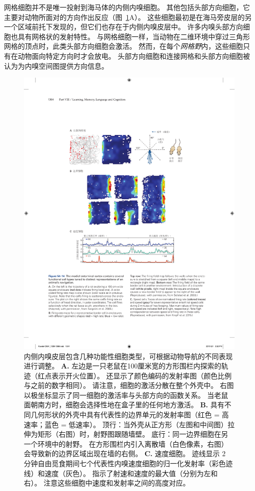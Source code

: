 网格细胞并不是唯一投射到海马体的内侧内嗅细胞。
其他包括头部方向细胞，它主要对动物所面对的方向作出反应（图~\ref{fig:54_14}A）。
这些细胞最初是在海马旁皮层的另一个区域前托下发现的，但它们也存在于内侧内嗅皮层中。
许多内嗅头部方向细胞也具有网格状的发射特性。
与网格细胞一样，当动物在二维环境中穿过三角形网格的顶点时，此类头部方向细胞会激活。
然而，在每个\textit{网格野}内，这些细胞只有在动物面向特定方向时才会放电。
头部方向细胞和连接网格和头部方向细胞被认为为内嗅空间图提供方向信息。


\begin{figure}[htbp]
	\centering
	\includegraphics[width=0.85\linewidth]{chap54/fig_54_14}
	\caption{内侧内嗅皮层包含几种功能性细胞类型，可根据动物导航的不同表现进行调整。
		\textbf{A.} 左边是一只老鼠在100厘米宽的方形围栏内探索的轨迹（红点表示开火位置）。
		还显示了颜色编码的发射率图（颜色比例与之前的数字相同）。
		请注意，细胞的激活分散在整个外壳中。
		右图以极坐标显示了同一细胞的激活率与头部方向的函数关系。
		当老鼠面朝南方时，细胞会选择性地在盒子里的任何地方激活\cite{sargolini2006conjunctive}。
		\textbf{B.} 具有不同几何形状的外壳中具有代表性的边界单元的发射率图（红色 = 高速率；蓝色 = 低速率）。
		顶行：当外壳从正方形（左图和中间图）拉伸为矩形（右图）时，射野图跟随墙壁。
		底行：同一边界细胞在另一个环境中的射野。
		在方形围栏内引入离散墙（白色像素，右图）会导致新的边界区域出现在墙的右侧\cite{solstad2008representation}。
		\textbf{C.} 速度细胞。
		迹线显示 2 分钟自由觅食期间七个代表性内嗅速度细胞的归一化发射率（彩色迹线）和速度（灰色）。
		指示了射速和速度的最大值（分别为左和右）。
		注意这些细胞中速度和发射率之间的高度对应\cite{kropff2015speed}。}
	\label{fig:54_14}
\end{figure}



